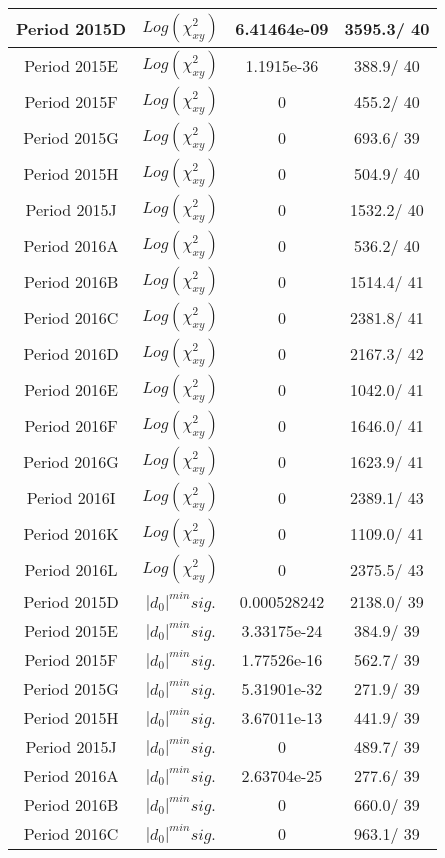\documentclass{article}
\begin{document}
\begin{longtable}{c|c|c|c}
\hline
 Period 2015D & $Log(\chi^{2}_{xy})$ & 6.41464e-09 & 3595.3/ 40\\
\hline
 Period 2015E & $Log(\chi^{2}_{xy})$ & 1.1915e-36 & 388.9/ 40\\
\hline
 Period 2015F & $Log(\chi^{2}_{xy})$ & 0 & 455.2/ 40\\
\hline
 Period 2015G & $Log(\chi^{2}_{xy})$ & 0 & 693.6/ 39\\
\hline
 Period 2015H & $Log(\chi^{2}_{xy})$ & 0 & 504.9/ 40\\
\hline
 Period 2015J & $Log(\chi^{2}_{xy})$ & 0 & 1532.2/ 40\\
\hline
 Period 2016A & $Log(\chi^{2}_{xy})$ & 0 & 536.2/ 40\\
\hline
 Period 2016B & $Log(\chi^{2}_{xy})$ & 0 & 1514.4/ 41\\
\hline
 Period 2016C & $Log(\chi^{2}_{xy})$ & 0 & 2381.8/ 41\\
\hline
 Period 2016D & $Log(\chi^{2}_{xy})$ & 0 & 2167.3/ 42\\
\hline
 Period 2016E & $Log(\chi^{2}_{xy})$ & 0 & 1042.0/ 41\\
\hline
 Period 2016F & $Log(\chi^{2}_{xy})$ & 0 & 1646.0/ 41\\
\hline
 Period 2016G & $Log(\chi^{2}_{xy})$ & 0 & 1623.9/ 41\\
\hline
 Period 2016I & $Log(\chi^{2}_{xy})$ & 0 & 2389.1/ 43\\
\hline
 Period 2016K & $Log(\chi^{2}_{xy})$ & 0 & 1109.0/ 41\\
\hline
 Period 2016L & $Log(\chi^{2}_{xy})$ & 0 & 2375.5/ 43\\
\hline
 Period 2015D & $|d_{0}|^{min} sig.$ & 0.000528242 & 2138.0/ 39\\
\hline
 Period 2015E & $|d_{0}|^{min} sig.$ & 3.33175e-24 & 384.9/ 39\\
\hline
 Period 2015F & $|d_{0}|^{min} sig.$ & 1.77526e-16 & 562.7/ 39\\
\hline
 Period 2015G & $|d_{0}|^{min} sig.$ & 5.31901e-32 & 271.9/ 39\\
\hline
 Period 2015H & $|d_{0}|^{min} sig.$ & 3.67011e-13 & 441.9/ 39\\
\hline
 Period 2015J & $|d_{0}|^{min} sig.$ & 0 & 489.7/ 39\\
\hline
 Period 2016A & $|d_{0}|^{min} sig.$ & 2.63704e-25 & 277.6/ 39\\
\hline
 Period 2016B & $|d_{0}|^{min} sig.$ & 0 & 660.0/ 39\\
\hline
 Period 2016C & $|d_{0}|^{min} sig.$ & 0 & 963.1/ 39\\

\end{longtable}
\end{document}
